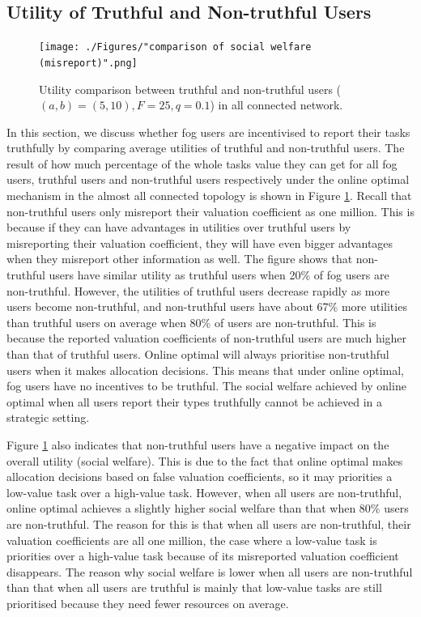 \documentclass[11pt]{phdthesis}
\begin{document}
\subsection{Utility of Truthful and Non-truthful Users} \label{utility evaluation}

\begin{figure}
    \centering
    \texttt{[image: ./Figures/"comparison of social welfare (misreport)".png]}
    \caption{Utility comparison between truthful and non-truthful users ($ (a, b) = (5, 10), F = 25, q = 0.1 $) in all connected network.}
    \label{fig: utility misreport}
\end{figure}

In this section, we discuss whether fog users are incentivised to report their tasks truthfully by comparing average utilities of truthful and non-truthful users. The result of how much percentage of the whole tasks value they can get for all fog users, truthful users and non-truthful users respectively under the online optimal mechanism in the almost all connected topology is shown in Figure \ref{fig: utility misreport}. Recall that non-truthful users only misreport their valuation coefficient as one million. This is because if they can have advantages in utilities over truthful users by misreporting their valuation coefficient, they will have even bigger advantages when they misreport other information as well. The figure shows that non-truthful users have similar utility as truthful users when 20\% of fog users are non-truthful. However, the utilities of truthful users decrease rapidly as more users become non-truthful, and non-truthful users have about 67\% more utilities than truthful users on average when 80\% of users are non-truthful. This is because the reported valuation coefficients of non-truthful users are much higher than that of truthful users. Online optimal will always prioritise non-truthful users when it makes allocation decisions. This means that under online optimal, fog users have no incentives to be truthful. The social welfare achieved by online optimal when all users report their types truthfully cannot be achieved in a strategic setting.

Figure \ref{fig: utility misreport} also indicates that non-truthful users have a negative impact on the overall utility (social welfare). This is due to the fact that online optimal makes allocation decisions based on false valuation coefficients, so it may priorities a low-value task over a high-value task. However, when all users are non-truthful, online optimal achieves a slightly higher social welfare than that when 80\% users are non-truthful. The reason for this is that when all users are non-truthful, their valuation coefficients are all one million, the case where a low-value task is priorities over a high-value task because of its misreported valuation coefficient disappears. The reason why social welfare is lower when all users are non-truthful than that when all users are truthful is mainly that low-value tasks are still prioritised because they need fewer resources on average.
\end{document}
